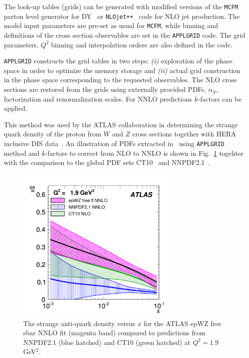 \begin{description}
\begin{itemize}
The look-up tables (grids) can be generated with modified versions
of the \texttt{MCFM} parton level generator for DY~\cite{Campbell:1999ah,Campbell:2000je,Campbell:2010ff} 
or \texttt{NLOjet++}~\cite{Nagy:1998bb,Nagy:2001fj} code for NLO jet production.
The model input parameters are pre-set as usual for \texttt{MCFM}, 
while binning and definitions of the
cross section observables are set in the \texttt{APPLGRID} code.
%
The grid parameters, \(Q^2\) binning
and interpolation orders are also defined in the code.

\texttt{APPLGRID} constructs the grid tables in two 
steps: {\it (i)} exploration of the phase space in order
to optimize the memory storage and {\it (ii)} actual grid
construction in the phase space corresponding to the 
requested observables.
The NLO cross sections are restored from the grids
using externally provided PDFs, \(\alpha_S\), factorization and 
renormalization scales. For NNLO predictions $k$-factors can be applied.

This method was used by the ATLAS collaboration in determining the strange 
quark density of the proton from $W$ and $Z$ cross sections 
together with HERA inclusive DIS data~\cite{atlas:strange}. 
An illustration of PDFs extracted in~\cite{atlas:strange} using \texttt{APPLGRID} method 
and $k$-factors to correct from NLO to NNLO is shown 
in Fig.~\ref{fig:atlas} togehter with the comparison to the global PDF sets 
CT10~\cite{CT10pdf} and NNPDF2.1~\cite{NNPDFpdf}.

\begin{figure}[!ht]
   \centering
   \includegraphics[width=8cm]{atlas.pdf}
   \caption{The strange anti-quark density versus $x$ for the ATLAS epWZ free sbar NNLO fit (magenta band) compared to predictions from NNPDF2.1 (blue hatched) and CT10 (green hatched) at $Q^2= 1.9$ GeV$^2$.}
 \label{fig:atlas}
\end{figure}



\end{itemize}
\end{description}
